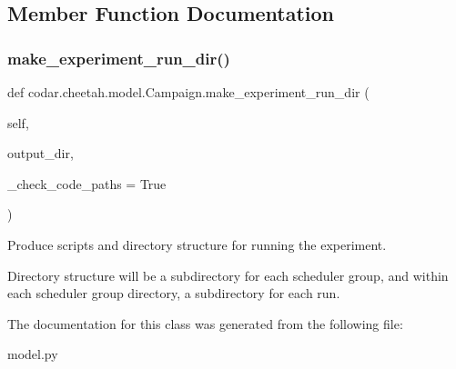\subsection{Member Function Documentation}
\mbox{\label{classcodar_1_1cheetah_1_1model_1_1_campaign_a09266b3421f37a82d8e12c1272e3f54b}} 
\subsubsection{\texorpdfstring{make\+\_\+experiment\+\_\+run\+\_\+dir()}{make\_experiment\_run\_dir()}}
{\footnotesize\ttfamily def codar.\+cheetah.\+model.\+Campaign.\+make\+\_\+experiment\+\_\+run\+\_\+dir (\begin{DoxyParamCaption}\item[{}]{self,  }\item[{}]{output\+\_\+dir,  }\item[{}]{\+\_\+check\+\_\+code\+\_\+paths = {\ttfamily True} }\end{DoxyParamCaption})}

\begin{DoxyVerb}Produce scripts and directory structure for running the experiment.

Directory structure will be a subdirectory for each scheduler group,
and within each scheduler group directory, a subdirectory for each
run.\end{DoxyVerb}
 

The documentation for this class was generated from the following file\+:\begin{DoxyCompactItemize}
\item 
model.\+py\end{DoxyCompactItemize}
